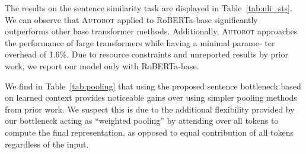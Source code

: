  The results on the sentence similarity task are displayed in Table~\ref{tab:nli_sts}.
 We can observe that \textsc{Autobot} applied to RoBERTa-base significantly outperforms other base transformer methods. Additionally,  \textsc{Autobot} approaches the performance of large  transformers while having a minimal   parame-    \noindent ter overhead of 1.6\%. Due to resource constraints and unreported results by prior work, we report our model only with RoBERTa-base.  %

 
 

 
We find in Table~\ref{tab:pooling} that using the proposed sentence bottleneck based on learned context  provides 
noticeable gains over using simpler pooling methods from prior work. We suspect this is due to the additional flexibility provided by our bottleneck acting as ``weighted pooling'' by attending over all tokens to compute the final representation, as opposed to equal contribution of all tokens regardless of the input. 




